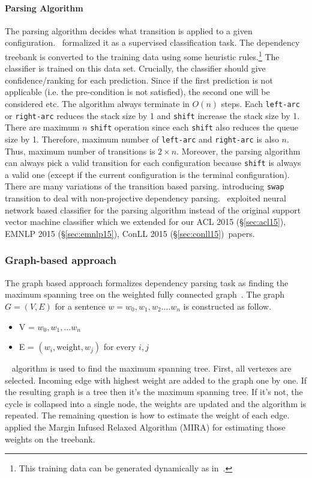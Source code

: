 \documentclass[12pt,twoside,final,hidelinks]{ltthesis}
\theoremstyle{definition}
\newcommand\conllv{ConLL 2015 (\S\ref{sec:conll15})}
\newcommand\aclv{ACL 2015 (\S\ref{sec:acl15})}
\newcommand\emnlpv{EMNLP 2015 (\S\ref{sec:emnlp15})}
\begin{document}
\paragraph{Parsing Algorithm}
The parsing algorithm decides what transition is applied to a given configuration.~ formalized it as a supervised classification task. The dependency treebank is converted to the training data using some heuristic rules.\footnote{This training data can be generated dynamically as in~.} The classifier is trained on this data set. Crucially, the classifier should give confidence/ranking for each prediction.
Since if the first prediction is not applicable (i.e. the pre-condition is not satisfied), the second one will be considered etc. 
The algorithm always terminate in $O(n)$ steps. Each \texttt{left-arc} or \texttt{right-arc} reduces the stack size by 1 and \texttt{shift} increase the stack size by 1. There are maximum $n$ \texttt{shift} operation since each \texttt{shift} also reduces the queue size by 1. Therefore, maximum number of \texttt{left-arc} and \texttt{right-arc} is also $n$. Thus, maximum number of transitions is $2\times n$. Moreover, the parsing algorithm can always pick a valid transition for each configuration because \texttt{shift} is always a valid one (except if the current configuration is the terminal configuration). 
There are many variations of the transition based parsing.  introducing \texttt{swap} transition to deal with non-projective dependency parsing.~ exploited neural network based classifier for the parsing algorithm instead of the original support vector machine classifier which we extended for our \aclv, \emnlpv, \conllv\ papers. 

\subsubsection{Graph-based approach }
The graph based approach formalizes dependency parsing task as finding the maximum spanning tree on the weighted fully connected graph~\cite{McDonald:2005:NDP}. The graph $G = (V,E)$ for a sentence $w = w_0,w_1,w_2....w_n$ is constructed as follow. 
\begin{itemize}
\item V = {$w_0,w_1,...w_n$}
\item E = {$(w_i,\text{weight},w_j)$} for every $i,j$
\end{itemize}
~ algorithm is used to find the maximum spanning tree. First, all vertexes are selected. Incoming edge with highest weight are added to the graph one by one. If the resulting graph is a tree then it's the maximum spanning tree. If it's not, the cycle is collapsed into a single node, the weights are updated and the algorithm is repeated. The remaining question is how to estimate the weight of each edge.~ applied the Margin Infused Relaxed Algorithm (MIRA) for estimating those weights on the treebank. 
\end{document}
